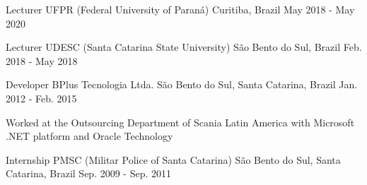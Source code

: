 

\begin{cventries}
	
	\cventry
	{Lecturer} %
	{UFPR (Federal University of Paraná)} %
	{Curitiba, Brazil} %
	{May 2018 - May 2020} %
	{
	}
	
	
	\cventry
	{Lecturer} %
	{UDESC (Santa Catarina State University)} %
	{São Bento do Sul, Brazil} %
	{Feb. 2018 - May 2018} %
	{
	}
	
	


  \cventry
    {Developer} %
    {BPlus Tecnologia Ltda.} %
    {São Bento do Sul, Santa Catarina, Brazil} %
    {Jan. 2012 - Feb. 2015} %
    {
      \begin{cvitems} %
        \item {Worked at the Outsourcing Department of Scania Latin America with Microsoft .NET platform and Oracle Technology}
      \end{cvitems}
    }



  \cventry
    {Internship} %
    {PMSC (Militar Police of Santa Catarina)} %
    {São Bento do Sul, Santa Catarina, Brazil} %
    {Sep. 2009 - Sep. 2011} %
    {
    }

\end{cventries}

